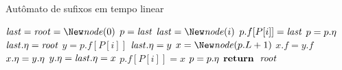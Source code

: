 \begin{algorithm}
\caption{Autômato de sufixos em tempo linear}
\label{lst:suffauto}
\begin{algorithmic}[1]
    \State $\last = \root = \New \node(0)$ \label{auto:init}
     \label{auto:for}
        \State $p = \mathit{last}$
        \State $\last = \New \node(i)$ 
         \label{auto:while1s}
            \State $p.f[P[i]] = \mathit{last}$ \label{auto:newclass}
            \State $p = p.\eta$ \label{auto:while1e}
        \EndWhile
            \State $\mathit{last}.\eta = \mathit{root}$ \label{auto:caso1}
        \Else
            \State $y = p.f[P[i]]$  \label{auto:caso23} \label{auto:findX}
              \label{auto:caso2s}
                \State $\mathit{last}.\eta = y$ \label{auto:caso2e}
            \Else {}
                \State $x = \New \node(p.L + 1)$ \label{auto:caso3s}
                \State $x.f = y.f$ \label{auto:copyf}
                \State $x.\eta = y.\eta$
                \State $y.\eta = \mathit{last}.\eta = x$ \label{auto:failupd}
                 \label{auto:while2s}
                    \State $p.f[P[i]] = x$ 
                    \State $p = p.\eta$ \label{auto:caso3e} \label{auto:while2e}
                \EndWhile
            \EndIf
        \EndIf
    \EndFor
    \State $\Return$~$\mathit{root}$
\EndFunction
\end{algorithmic}
\end{algorithm}


